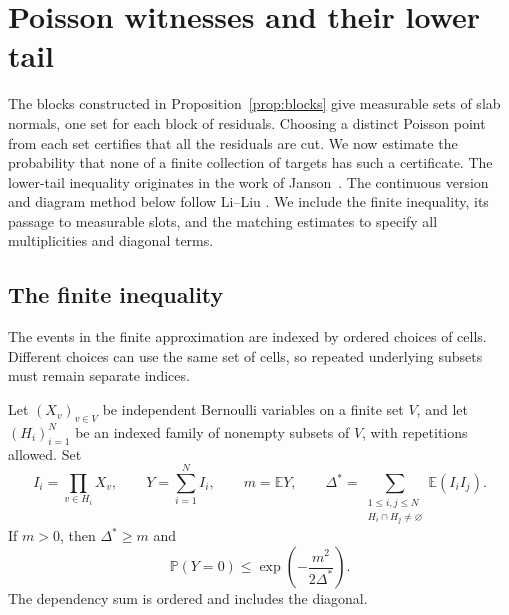 \section{Poisson witnesses and their lower tail}
\label{sec:poisson}

The blocks constructed in Proposition~\ref{prop:blocks} give measurable
sets of slab normals, one set for each block of residuals. Choosing a
distinct Poisson point from each set certifies that all the residuals are
cut. We now estimate the probability that none of a finite collection of
targets has such a certificate. The lower-tail inequality originates in
the work of Janson~\cite{Janson1990LargeDeviations}. The continuous version
and diagram method below follow Li--Liu
\cite[Lemma~6.4, Equation~(6.16), and Lemma~9.6]{LiLiu2026Lattice}.
We include the finite
inequality, its passage to measurable slots, and the matching estimates
to specify all multiplicities and diagonal terms.

\subsection{The finite inequality}

The events in the finite approximation are indexed by ordered choices of
cells. Different choices can use the same set of cells, so repeated
underlying subsets must remain separate indices.

\begin{lemma}
\label{lem:finite-janson}
Let $(X_v)_{v\in V}$ be independent Bernoulli variables on a finite set
$V$, and let $(H_i)_{i=1}^N$ be an indexed family of nonempty subsets of
$V$, with repetitions allowed. Set
\[
 I_i=\prod_{v\in H_i}X_v,\qquad Y=\sum_{i=1}^NI_i,\qquad m=\mathbb{E}Y,
 \qquad
 \Delta^*=\sum_{\substack{1\le i,j\le N\\H_i\cap H_j\ne\varnothing}}
                  \mathbb{E}(I_iI_j).
\]
If $m>0$, then $\Delta^*\ge m$ and
\begin{equation}
 \mathbb{P}(Y=0)\le \exp\left(-\frac{m^2}{2\Delta^*}\right).
 \label{eq:finite-janson}
\end{equation}
The dependency sum is ordered and includes the diagonal.
\end{lemma}

